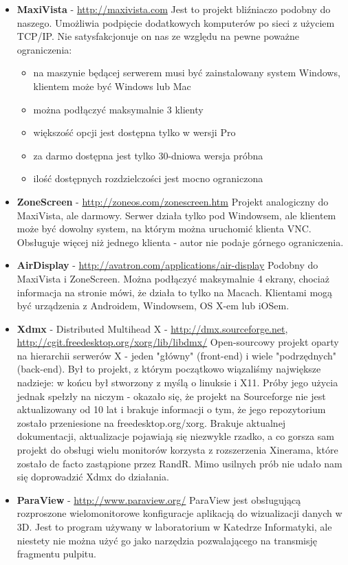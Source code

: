     \begin{itemize}
      \item \textbf{MaxiVista} - \url{http://maxivista.com}
        Jest to projekt bliźniaczo podobny do naszego. Umożliwia podpięcie dodatkowych komputerów po sieci z użyciem TCP/IP. Nie satysfakcjonuje on nas ze względu na pewne poważne ograniczenia:
        \begin{itemize}
          \item na maszynie będącej serwerem musi być zainstalowany system Windows, klientem może być Windows lub Mac
          \item można podłączyć maksymalnie 3 klienty
          \item większość opcji jest dostępna tylko w wersji Pro
          \item za darmo dostępna jest tylko 30-dniowa wersja próbna
          \item ilość dostępnych rozdzielczości jest mocno ograniczona
        \end{itemize}

      \item \textbf{ZoneScreen} - \url{http://zoneos.com/zonescreen.htm}
        Projekt analogiczny do MaxiVista, ale darmowy. Serwer działa tylko pod Windowsem, ale klientem może być dowolny system, na którym można uruchomić klienta VNC. Obsługuje więcej niż jednego klienta - autor nie podaje górnego ograniczenia.

      \item \textbf{AirDisplay} - \url{http://avatron.com/applications/air-display}
        Podobny do MaxiVista i ZoneScreen. Można podłączyć maksymalnie 4 ekrany, chociaż informacja na stronie mówi, że działa to tylko na Macach. Klientami mogą być urządzenia z Androidem, Windowsem, OS X-em lub iOSem.

      \item \textbf{Xdmx} - Distributed Multihead X - \url{http://dmx.sourceforge.net}, \url{http://cgit.freedesktop.org/xorg/lib/libdmx/}
        Open-sourcowy projekt oparty na hierarchii serwerów X - jeden "główny" (front-end) i wiele "podrzędnych" (back-end). Był to projekt, z którym początkowo wiązaliśmy największe nadzieje: w końcu był stworzony z myślą o linuksie i X11. Próby jego użycia jednak spełzły na niczym - okazało się, że projekt na Sourceforge nie jest aktualizowany od 10 lat i brakuje informacji o tym, że jego repozytorium zostało przeniesione na freedesktop.org/xorg. Brakuje aktualnej dokumentacji, aktualizacje pojawiają się niezwykle rzadko, a co gorsza sam projekt do obsługi wielu monitorów korzysta z rozszerzenia Xinerama, które zostało de facto zastąpione przez RandR. Mimo usilnych prób nie udało nam się doprowadzić Xdmx do działania.

      \item \textbf{ParaView} - \url{http://www.paraview.org/}
        ParaView jest obsługującą rozproszone wielomonitorowe konfiguracje aplikacją do wizualizacji danych w 3D. Jest to program używany w laboratorium w Katedrze Informatyki, ale niestety nie można użyć go jako narzędzia pozwalającego na transmisję fragmentu pulpitu.
    \end{itemize}

